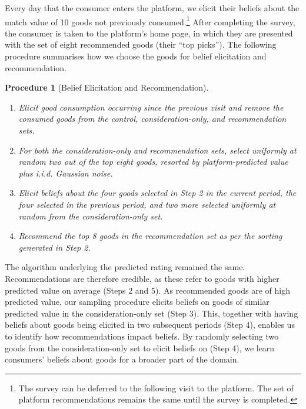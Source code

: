 \documentclass[12pt]{article}
\theoremstyle{newtheorem}
\newtheorem{proc}{Procedure}
\begin{document}
Every day that the consumer enters the platform, we elicit their beliefs about the match value of 10 goods not previously consumed.\footnote{
    The survey can be deferred to the following visit to the platform. 
    The set of platform recommendations remains the same until the survey is completed. 
} 
After completing the survey, the consumer is taken to the platform's home page, in which they are presented with the set of eight recommended goods (their ``top picks'').
The following procedure summarises how we choose the goods for belief elicitation and recommendation.
\begin{proc}[Belief Elicitation and Recommendation]
    \label{procedure:belief-elicitation-rec}~
    \begin{enumerate}[label=Step \arabic*., itemsep=0em]
        \item 
        Elicit good consumption occurring since the previous visit and remove the consumed goods from the control, consideration-only, and recommendation sets. 
        \item 
        For both the consideration-only and recommendation sets, 
        select uniformly at random two out of the top eight goods, resorted by platform-predicted value plus i.i.d. Gaussian noise. 
        \item 
        Elicit beliefs about the four goods selected in Step 2 in the current period, the four selected in the previous period, and two more selected uniformly at random from the consideration-only set.
        \item
        Recommend the top 8 goods in the recommendation set as per the sorting generated in Step 2.
    \end{enumerate}
\end{proc}


The algorithm underlying the predicted rating remained the same. 
Recommendations are therefore credible, as these refer to goods with higher predicted value on average (Steps 2 and 5). 
As recommended goods are of high predicted value, our sampling procedure elicits beliefs on goods of similar predicted value in the consideration-only set (Step 3). 
This, together with having beliefs about goods being elicited in two subsequent periods (Step 4), enables us to identify how recommendations impact beliefs. 
By randomly selecting two goods from the consideration-only set to elicit beliefs on (Step 4), we learn consumers' beliefs about goods for a broader part of the domain. 
\end{document}

